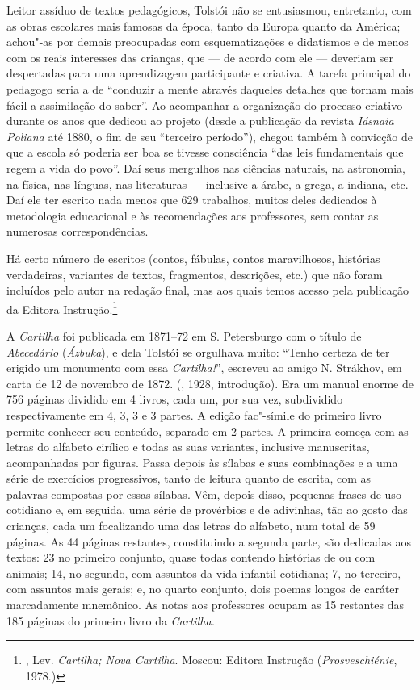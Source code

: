 Leitor assíduo de textos pedagógicos, Tolstói não se entusiasmou,
entretanto, com as obras escolares mais famosas da época, tanto da
Europa quanto da América; achou"-as por demais preocupadas com
esquematizações e didatismos e de menos com os reais interesses
das crianças, que --- de acordo com ele --- deveriam ser
despertadas para uma aprendizagem participante e criativa.
A tarefa principal do pedagogo seria a de ``conduzir a mente
através daqueles detalhes que tornam mais fácil a assimilação
do saber''. Ao acompanhar a organização do processo criativo
durante os anos que dedicou ao projeto (desde a publicação da
revista \emph{Iásnaia Poliana} até 1880, o fim de seu ``terceiro
período''), chegou também à convicção de que a escola só poderia
ser boa se tivesse consciência ``das leis fundamentais que regem
a vida do povo''. Daí seus mergulhos nas ciências naturais, na
astronomia, na física, nas línguas, nas literaturas --- inclusive
a árabe, a grega, a indiana, etc. Daí ele ter escrito nada menos
que 629 trabalhos, muitos deles dedicados à metodologia
educacional e às recomendações aos professores, sem contar
as numerosas correspondências. 

Há certo número de escritos (contos, fábulas, contos maravilhosos, histórias verdadeiras, variantes de textos, fragmentos, descrições, etc.) que não foram incluídos pelo autor na redação final, mas aos quais temos acesso pela publicação da Editora Instrução.\footnote{, Lev. \emph{Cartilha; Nova Cartilha}. Moscou: Editora Instrução (\emph{Prosveschiénie}, 1978.)}

A \emph{Cartilha} foi publicada em 1871--72 em S. Petersburgo com o título
de \emph{Abecedário} (\emph{Ázbuka}), e dela Tolstói se
orgulhava muito: ``Tenho certeza de ter erigido um monumento
com essa \emph{Cartilha!}'', escreveu ao amigo N. Strákhov, em
carta de 12 de novembro de 1872. (, 1928,
introdução). Era um manual enorme de 756 páginas dividido em
4 livros, cada um, por sua vez, subdividido respectivamente em
4, 3, 3 e 3 partes. A edição fac"-símile do primeiro livro permite
conhecer seu conteúdo, separado em 2 partes. A primeira começa
com as letras do alfabeto cirílico e todas as suas variantes,
inclusive   manuscritas, acompanhadas por figuras. Passa depois
às sílabas e suas combinações e a uma série de exercícios
progressivos, tanto de leitura quanto de escrita, com as
palavras compostas por essas sílabas. Vêm, depois disso,
pequenas frases de uso cotidiano e, em seguida, uma série de
provérbios e de adivinhas, tão ao gosto das crianças, cada um
focalizando uma das letras do alfabeto, num total de 59 páginas.
As 44 páginas restantes, constituindo a segunda parte, são
dedicadas aos textos: 23 no primeiro conjunto, quase todas
contendo histórias de ou com animais; 14, no segundo, com
assuntos da vida infantil cotidiana; 7, no terceiro, com
assuntos mais gerais; e, no quarto conjunto, dois poemas
longos de caráter marcadamente mnemônico. As notas aos
professores ocupam as 15 restantes das 185 páginas do
primeiro livro da \emph{Cartilha.}

